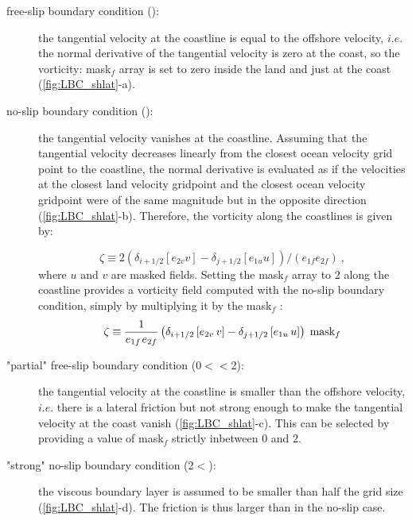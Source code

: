 \documentclass[../main/NEMO_manual]{subfiles}
\begin{document}
\begin{description}

\item[free-slip boundary condition ():] the tangential velocity at
  the coastline is equal to the offshore velocity,
  $i.e.$ the normal derivative of the tangential velocity is zero at the coast,
  so the vorticity: mask$_{f}$ array is set to zero inside the land and just at the coast
  (\autoref{fig:LBC_shlat}-a).

\item[no-slip boundary condition ():] the tangential velocity vanishes at the coastline.
  Assuming that the tangential velocity decreases linearly from
  the closest ocean velocity grid point to the coastline,
  the normal derivative is evaluated as if the velocities at the closest land velocity gridpoint and
  the closest ocean velocity gridpoint were of the same magnitude but in the opposite direction
  (\autoref{fig:LBC_shlat}-b).
  Therefore, the vorticity along the coastlines is given by: 

  \[
    \zeta \equiv 2 \left(\delta_{i+1/2} \left[e_{2v} v \right] - \delta_{j+1/2} \left[e_{1u} u \right] \right) / \left(e_{1f} e_{2f} \right) \ ,
  \]
  where $u$ and $v$ are masked fields.
  Setting the mask$_{f}$ array to $2$ along the coastline provides a vorticity field computed with
  the no-slip boundary condition, simply by multiplying it by the mask$_{f}$ :
  \[
    \zeta \equiv \frac{1}{e_{1f} {\kern 1pt}e_{2f} }\left( {\delta_{i+1/2}
        \left[ {e_{2v} \,v} \right]-\delta_{j+1/2} \left[ {e_{1u} \,u} \right]}
    \right)\;\mbox{mask}_f
  \]

\item["partial" free-slip boundary condition (0$<$$<$2):] the tangential velocity at
  the coastline is smaller than the offshore velocity, $i.e.$ there is a lateral friction but
  not strong enough to make the tangential velocity at the coast vanish (\autoref{fig:LBC_shlat}-c).
  This can be selected by providing a value of mask$_{f}$ strictly inbetween $0$ and $2$.

\item["strong" no-slip boundary condition (2$<$):] the viscous boundary layer is assumed to
  be smaller than half the grid size (\autoref{fig:LBC_shlat}-d).
  The friction is thus larger than in the no-slip case.

\end{description}
\end{document}
